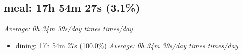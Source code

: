 \documentclass[12pt]{extarticle}
\begin{document}
{\fontsize{16}{19.2}\selectfont\subsection*{meal: 17h 54m 27s (3.1\%)}}
\textit{Average: 0h 34m 39s/day  times  times/day}\par
\begin{itemize}[topsep=0pt, itemsep=-0.5ex]
    \item dining: 17h 54m 27s (100.0\%)
        \textit{Average: 0h 34m 39s/day  times  times/day}\par
\end{itemize}
\end{document}
